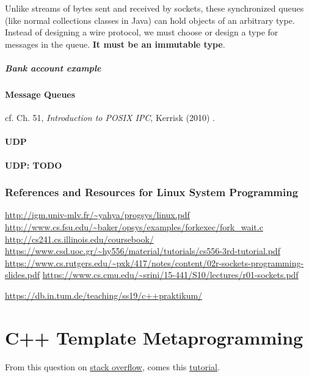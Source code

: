 \documentclass[10pt]{amsart}
\begin{document}
Unlike streams of bytes sent and received by sockets, these synchronized queues (like normal collections classes in Java) can hold objects of an arbitrary type. Instead of designing a wire protocol, we must choose or design a type for messages in the queue. \textbf{It must be an immutable type}. 


\subsubsection{Bank account example}

\subsection{Message Queues}

cf. Ch. 51, \emph{Introduction to POSIX IPC}, Kerrisk (2010) \cite{Kerr2010}.


\subsection{UDP}

\textbf{UDP: TODO}


\section{References and Resources for Linux System Programming}

\url{http://igm.univ-mlv.fr/~yahya/progsys/linux.pdf} \\
\url{http://www.cs.fsu.edu/~baker/opsys/examples/forkexec/fork_wait.c} \\
\url{http://cs241.cs.illinois.edu/coursebook/}
\url{https://www.csd.uoc.gr/~hy556/material/tutorials/cs556-3rd-tutorial.pdf}
\url{https://www.cs.rutgers.edu/~pxk/417/notes/content/02r-sockets-programming-slides.pdf}
\url{https://www.cs.cmu.edu/~srini/15-441/S10/lectures/r01-sockets.pdf}

\url{https://db.in.tum.de/teaching/ss19/c++praktikum/}




\part{C++ Template Metaprogramming}

From this question on \href{https://stackoverflow.com/questions/112277/best-introduction-to-c-template-metaprogramming}{stack overflow}, comes this \href{http://www.cs.rpi.edu/~musser/design/blitz/meta-art.html}{tutorial}. 
\end{document}
